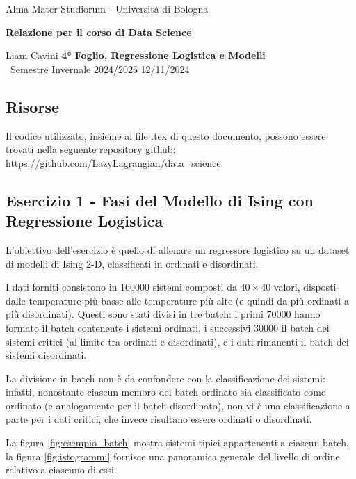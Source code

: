 \documentclass{article}
\begin{document}
\begin{center}
    {\Large Alma Mater Studiorum - Università di Bologna}
    
    \vspace{0.5cm}
    {\bf \large Relazione per il corso di Data Science}
\end{center} 

\noindent
{ Liam Cavini} \hfill {\bf 4° Foglio, Regressione Logistica e Modelli}\\
{\ Semestre Invernale 2024/2025} \hfill 12/11/2024

\subsection*{Risorse}
Il codice utilizzato, insieme al file .tex di questo documento, possono essere trovati nella seguente repository github: \url{https://github.com/LazyLagrangian/data_science}.

\subsection*{Esercizio 1 - Fasi del Modello di Ising con Regressione Logistica}
L'obiettivo dell'esercizio è quello di allenare un regressore logistico su un dataset di modelli di Ising 2-D, classificati in ordinati e disordinati.

I dati forniti consistono in 160000 sistemi composti da $40\times40$ valori, disposti dalle temperature più basse alle temperature più alte (e quindi da più ordinati a più disordinati). Questi sono stati divisi in tre batch:
i primi $70000$ hanno formato il batch contenente i sistemi ordinati, i successivi $30000$ il batch dei sistemi critici (al limite tra ordinati e disordinati), e i dati rimanenti il batch dei sistemi disordinati.

La divisione in batch non è da confondere con la classificazione dei sistemi:
infatti, nonostante ciascun membro del batch ordinato sia classificato come ordinato (e analogamente per il batch disordinato), 
non vi è una classificazione a parte per i dati critici, che invece risultano essere ordinati o disordinati.

La figura \ref{fig:esempio_batch} mostra sistemi tipici appartenenti a ciascun batch,
la figura \ref{fig:istogrammi} fornisce una panoramica generale del livello di ordine relativo a ciascuno di essi.
\end{document}

